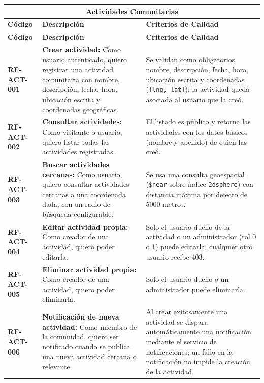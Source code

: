 \begin{longtable}{|l||p{7cm}|p{4.5cm}|}

\multicolumn{3}{c}{Actividades Comunitarias}\\
\hline\hline
\textbf{Código} & \textbf{Descripción} & \textbf{Criterios de Calidad}\\
\hline
\endfirsthead
\textbf{Código} & \textbf{Descripción} & \textbf{Criterios de Calidad}\\
\hline\hline
\endhead

\textbf{RF-ACT-001} & \textbf{Crear actividad:} Como usuario autenticado, quiero registrar una actividad comunitaria con nombre, descripción, fecha, hora, ubicación escrita y coordenadas geográficas. & Se validan como obligatorios nombre, descripción, fecha, hora, ubicación escrita y coordenadas (\texttt{[lng, lat]}); la actividad queda asociada al usuario que la creó. \\
\hline
\textbf{RF-ACT-002} & \textbf{Consultar actividades:} Como visitante o usuario, quiero listar todas las actividades registradas. & El listado es público y retorna las actividades con los datos básicos (nombre y apellido) de quien las creó. \\
\hline
\textbf{RF-ACT-003} & \textbf{Buscar actividades cercanas:} Como usuario, quiero consultar actividades cercanas a una coordenada dada, con un radio de búsqueda configurable. & Se usa una consulta geoespacial (\texttt{\$near} sobre índice \texttt{2dsphere}) con distancia máxima por defecto de 5000 metros. \\
\hline
\textbf{RF-ACT-004} & \textbf{Editar actividad propia:} Como creador de una actividad, quiero poder editarla. & Solo el usuario dueño de la actividad o un administrador (rol 0 o 1) puede editarla; cualquier otro usuario recibe 403. \\
\hline
\textbf{RF-ACT-005} & \textbf{Eliminar actividad propia:} Como creador de una actividad, quiero poder eliminarla. & Solo el usuario dueño o un administrador puede eliminarla. \\
\hline
\textbf{RF-ACT-006} & \textbf{Notificación de nueva actividad:} Como miembro de la comunidad, quiero ser notificado cuando se publica una nueva actividad cercana o relevante. & Al crear exitosamente una actividad se dispara automáticamente una notificación mediante el servicio de notificaciones; un fallo en la notificación no impide la creación de la actividad. \\
\hline
\end{longtable}

